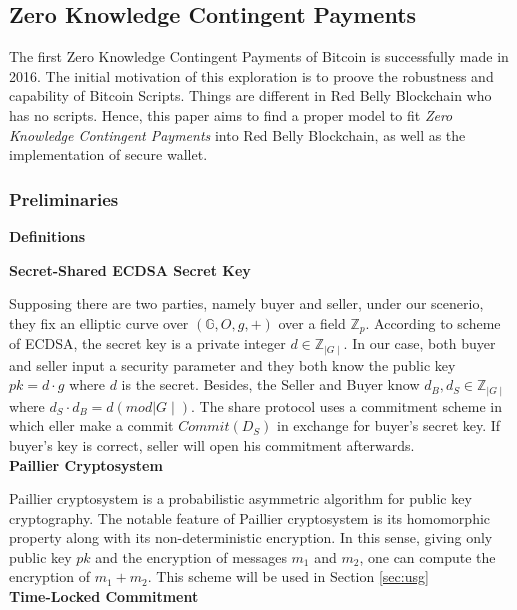 \documentclass[12pt]{article}
\begin{document}
\subsection{Zero Knowledge Contingent Payments}

The first Zero Knowledge Contingent Payments of Bitcoin is successfully made in 2016. The initial motivation of this exploration is to proove the robustness and capability of Bitcoin Scripts. Things are different in Red Belly Blockchain who has no scripts. Hence, this paper aims to find a proper model to fit \textit{Zero Knowledge Contingent Payments} into Red Belly Blockchain, as well as the implementation of secure wallet.

\subsubsection{Preliminaries}
\label{sec:zkcp_preliminaries}

\textbf{Definitions\\}

\textbf{Secret-Shared ECDSA Secret Key}

Supposing there are two parties, namely buyer and seller, under our scenerio, they fix an elliptic curve over $(\mathbb{G},O,g,+)$ over a field ${\mathbb{Z}_p}$. According to scheme of ECDSA, the secret key is a private integer $d\in{\mathbb{Z}_{\mid G \mid}}$. In our case, both buyer and seller input a security parameter and they both know the public key $pk = d \cdot g$ where $d$ is the secret. Besides, the Seller and Buyer know ${d_B}, {d_S} \in {\mathbb{Z}_{\mid G \mid}}$ where ${d_S} \cdot {d_B} = d (mod {\mid G \mid})$.  The share protocol uses a commitment scheme in which eller make a commit $Commit({D_S})$ in exchange for buyer's secret key. If buyer's key is correct, seller will open his commitment afterwards. \\

\textbf{Paillier Cryptosystem}

Paillier cryptosystem is a probabilistic asymmetric algorithm for public key cryptography. The notable feature of Paillier cryptosystem is its homomorphic property along with its non-deterministic encryption. In this sense, giving only public key $pk$ and the encryption of messages ${m_1}$ and ${m_2}$, one can compute the encryption of ${m_1}+{m_2}$. This scheme will be used in Section \ref{sec:usg}\\

\textbf{Time-Locked Commitment}
\end{document}
